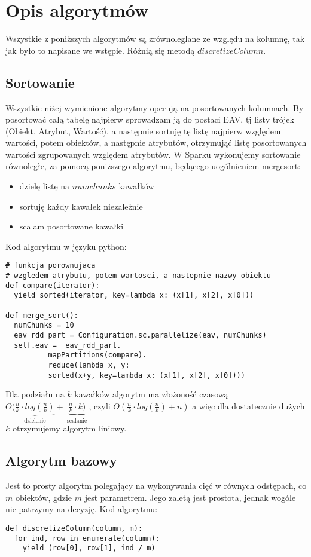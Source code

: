 \documentclass[magisterska]{pracamgr}
\theoremstyle{plain}
\theoremstyle{definition}
\theoremstyle{remark}
\begin{document}
\section{Opis algorytmów}
Wszystkie z poniższych algorytmów są zrównoleglane ze względu na kolumnę, tak 
jak było to napisane we wstępie. Różnią się metodą $discretizeColumn$.
\subsection{Sortowanie}
Wszystkie niżej wymienione algorytmy operują na posortowanych kolumnach. By posortować całą tabelę najpierw
sprowadzam ją do postaci EAV, tj listy trójek (Obiekt, Atrybut, Wartość), a następnie sortuję tę listę 
najpierw względem wartości, potem obiektów, a następnie atrybutów, otrzymująć listę posortowanych wartości
zgrupowanych względem atrybutów. W Sparku wykonujemy sortowanie równoległe, za pomocą poniższego algorytmu,
będącego uogólnieniem mergesort:
\begin{itemize}
 \item dzielę listę na $numchunks$ kawałków
 \item sortuję każdy kawałek niezależnie
 \item scalam posortowane kawałki
\end{itemize}
Kod algorytmu w języku python:
\begin{lstlisting}
# funkcja porownujaca
# wzgledem atrybutu, potem wartosci, a nastepnie nazwy obiektu
def compare(iterator):
  yield sorted(iterator, key=lambda x: (x[1], x[2], x[0]))

def merge_sort():
  numChunks = 10
  eav_rdd_part = Configuration.sc.parallelize(eav, numChunks)
  self.eav =  eav_rdd_part.
	      mapPartitions(compare).
	      reduce(lambda x, y: 
	      sorted(x+y, key=lambda x: (x[1], x[2], x[0])))
\end{lstlisting}

Dla podziału na $k$ kawałków algorytm ma złożoność czasową 
$O(\underbrace{\frac{n}{k} \cdot log(\frac{n}{k})}_{\text{ dzielenie }} + \underbrace{\frac{n}{k} \cdot k)}_{\text{ scalanie }}$,
	    czyli $O(\frac{n}{k} \cdot log(\frac{n}{k}) + n)$
a więc dla dostatecznie dużych $k$ otrzymujemy algorytm liniowy.
	      
	      

\subsection{Algorytm bazowy}
Jest to prosty algorytm polegający na wykonywania cięć w równych odstępach, co $m$ obiektów, gdzie
$m$ jest parametrem.
Jego zaletą jest prostota, jednak wogóle nie patrzymy na decyzję.
Kod algorytmu:
\begin{lstlisting} 
def discretizeColumn(column, m):
  for ind, row in enumerate(column):
    yield (row[0], row[1], ind / m)
\end{lstlisting}
\end{document}

